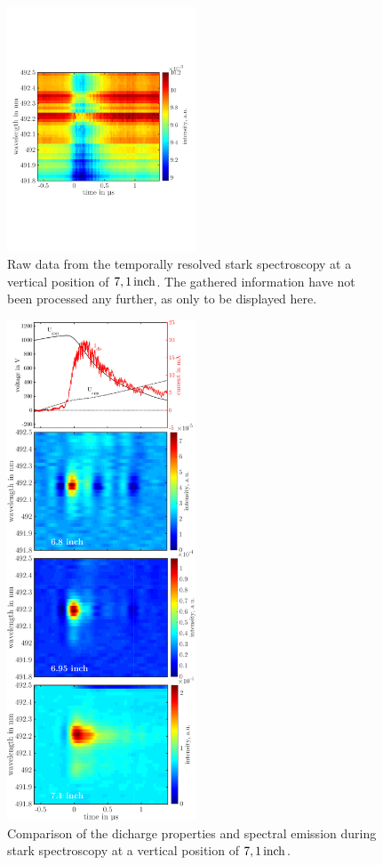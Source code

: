 \documentclass[a4paper,10pt,twoside]{article}
\begin{document}
				\begin{figure}
					\centering
					\includegraphics[width=0.5\textwidth]{figures/stark/stark_71inraw.pdf}
					\caption{Raw data from the temporally resolved stark spectroscopy at a vertical position of $\unit[7,1]{inch}$. The gathered information have not been processed any further, as only to be displayed here.}
					\label{img:rawdata}
				\end{figure}

				\begin{figure}
					\centering
					\includegraphics[width=0.5\textwidth]{figures/stark/combinations/starkallheightscombination.pdf}
					\caption{Comparison of the dicharge properties and spectral emission during stark spectroscopy at a vertical position of $\unit[7,1]{inch}$. }
					\label{img:stark71comparison}
				\end{figure}
\end{document}
